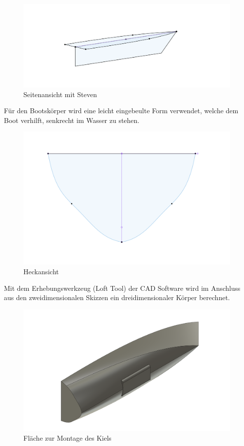 \begin{figure}[H]
    \centering
    \includegraphics[width=1\linewidth]{assets/boot_skizze_2.png}
    \caption{Seitenansicht mit Steven}
    
\end{figure}

Für den Bootskörper wird eine leicht eingebeulte Form verwendet, welche dem Boot verhilft, senkrecht im Wasser zu stehen.

\begin{figure}[H]
    \centering
    \includegraphics[width=0.6\linewidth]{assets/Heck_boot.png}
    \caption{Heckansicht}
   
\end{figure}

Mit dem Erhebungswerkzeug (Loft Tool) der CAD Software wird im Anschluss aus den zweidimensionalen Skizzen ein dreidimensionaler Körper berechnet.
\begin{figure}[H]
    \centering
    \includegraphics[width=0.75\linewidth]{assets/kielbefestigung2image.png}
    \caption{Fläche zur Montage des Kiels}
    \label{fig:enter-label}
\end{figure}


